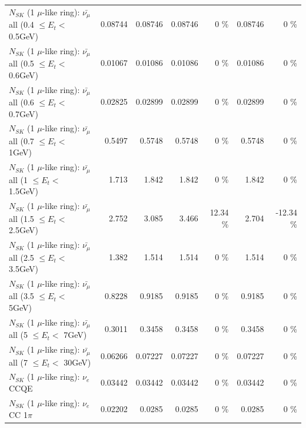 \begin{table}
\begin{tabular}{| l | r | r | r  r | r  r |}
 $N_{SK}$ (1 $\mu$-like ring): $\bar{\nu_{\mu}}$ all (0.4 $\leq E_{t} <$ 0.5GeV) &         0.08744 &         0.08746 &         0.08746 &        0 \%  &         0.08746 &        0 \%  \\ 
 $N_{SK}$ (1 $\mu$-like ring): $\bar{\nu_{\mu}}$ all (0.5 $\leq E_{t} <$ 0.6GeV) &         0.01067 &         0.01086 &         0.01086 &        0 \%  &         0.01086 &        0 \%  \\ 
 $N_{SK}$ (1 $\mu$-like ring): $\bar{\nu_{\mu}}$ all (0.6 $\leq E_{t} <$ 0.7GeV) &         0.02825 &         0.02899 &         0.02899 &        0 \%  &         0.02899 &        0 \%  \\ 
   $N_{SK}$ (1 $\mu$-like ring): $\bar{\nu_{\mu}}$ all (0.7 $\leq E_{t} <$ 1GeV) &          0.5497 &          0.5748 &          0.5748 &        0 \%  &          0.5748 &        0 \%  \\ 
   $N_{SK}$ (1 $\mu$-like ring): $\bar{\nu_{\mu}}$ all (1 $\leq E_{t} <$ 1.5GeV) &           1.713 &           1.842 &           1.842 &        0 \%  &           1.842 &        0 \%  \\ 
 $N_{SK}$ (1 $\mu$-like ring): $\bar{\nu_{\mu}}$ all (1.5 $\leq E_{t} <$ 2.5GeV) &           2.752 &           3.085 &           3.466 &    12.34 \%  &           2.704 &   -12.34 \%  \\ 
 $N_{SK}$ (1 $\mu$-like ring): $\bar{\nu_{\mu}}$ all (2.5 $\leq E_{t} <$ 3.5GeV) &           1.382 &           1.514 &           1.514 &        0 \%  &           1.514 &        0 \%  \\ 
   $N_{SK}$ (1 $\mu$-like ring): $\bar{\nu_{\mu}}$ all (3.5 $\leq E_{t} <$ 5GeV) &          0.8228 &          0.9185 &          0.9185 &        0 \%  &          0.9185 &        0 \%  \\ 
     $N_{SK}$ (1 $\mu$-like ring): $\bar{\nu_{\mu}}$ all (5 $\leq E_{t} <$ 7GeV) &          0.3011 &          0.3458 &          0.3458 &        0 \%  &          0.3458 &        0 \%  \\ 
    $N_{SK}$ (1 $\mu$-like ring): $\bar{\nu_{\mu}}$ all (7 $\leq E_{t} <$ 30GeV) &         0.06266 &         0.07227 &         0.07227 &        0 \%  &         0.07227 &        0 \%  \\ 
\hline
\hline
\hline
                                      $N_{SK}$ (1 $\mu$-like ring): $\nu_e$ CCQE &         0.03442 &         0.03442 &         0.03442 &        0 \%  &         0.03442 &        0 \%  \\ 
                                 $N_{SK}$ (1 $\mu$-like ring): $\nu_e$ CC 1$\pi$ &         0.02202 &          0.0285 &          0.0285 &        0 \%  &          0.0285 &        0 \%  \\ 

\end{tabular}
\end{table}
